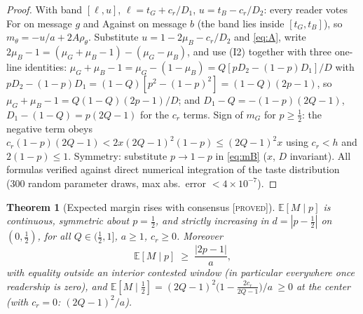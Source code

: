 \documentclass[11pt]{article}
\newtheorem{theorem}{Theorem}
\theoremstyle{remark}
\newcommand{\E}{\mathbb{E}}
\newcommand{\statusP}{\textsc{[proved]}}
\begin{document}
\begin{proof}
With band $[\ell,u]$, $\ell=t_G+c_r/D_1$, $u=t_B-c_r/D_2$: every reader votes
For on message $g$ and Against on message $b$ (the band lies inside
$[t_G,t_B]$), so $m_\theta=-u/a+2A\rho_\theta$. Substitute
$u=1-2\mu_B-c_r/D_2$ and \eqref{eq:A}, write
$2\mu_B-1=(\mu_G+\mu_B-1)-(\mu_G-\mu_B)$, and use (I2) together with three
one-line identities: $\mu_G+\mu_B-1=\mu_G-(1-\mu_B)=Q[pD_2-(1-p)D_1]/D$ with
$pD_2-(1-p)D_1=(1-Q)[p^2-(1-p)^2]=(1-Q)(2p-1)$, so
$\mu_G+\mu_B-1=Q(1-Q)(2p-1)/D$; and $D_1-Q=-(1-p)(2Q-1)$,
$D_1-(1-Q)=p(2Q-1)$ for the $c_r$ terms.
Sign of $m_G$ for $p\ge\tfrac12$: the negative term obeys
$c_r(1-p)(2Q-1)<2x(2Q-1)^2(1-p)\le(2Q-1)^2x$ using $c_r<h$ and $2(1-p)\le1$.
Symmetry: substitute $p\to1-p$ in \eqref{eq:mB} ($x$, $D$ invariant).
All formulas verified against direct numerical integration of the taste
distribution (300 random parameter draws, max abs.\ error $<4\times10^{-7}$).
\end{proof}

\begin{theorem}[Expected margin rises with consensus \statusP]\label{thm:margin}
$\E[M\mid p]$ is continuous, symmetric about $p=\tfrac12$, and \emph{strictly
increasing} in $d=|p-\tfrac12|$ on $(0,\tfrac12)$, for all
$Q\in(\tfrac12,1]$, $a\ge1$, $c_r\ge0$. Moreover
\begin{equation}\label{eq:floor}
\E[M\mid p]\;\ge\;\frac{|2p-1|}{a},
\end{equation}
with equality outside an interior contested window (in particular everywhere
once readership is zero), and $\E[M\mid\tfrac12]=(2Q-1)^2\bigl(1-\tfrac{2c_r}{2Q-1}\bigr)/a\ \ge 0$
at the center (with $c_r=0$: $(2Q-1)^2/a$).
\end{theorem}
\end{document}
